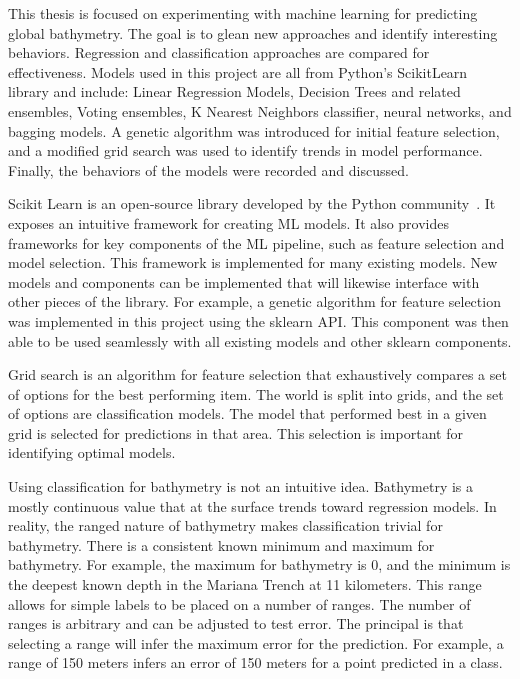 \par
This thesis is focused on experimenting with machine learning for predicting global bathymetry.
The goal is to glean new approaches and identify interesting behaviors.
Regression and classification approaches are compared for effectiveness.
Models used in this project are all from Python's ScikitLearn library and include: Linear Regression Models, Decision Trees and related ensembles, Voting ensembles, K Nearest Neighbors classifier, neural networks, and bagging models.
A genetic algorithm was introduced for initial feature selection, and a modified grid search was used to identify trends in model performance.
Finally, the behaviors of the models were recorded and discussed.

\par
Scikit Learn is an open-source library developed by the Python community~\cite{scikit-learn}.
It exposes an intuitive framework for creating \ac{ML} models.
It also provides frameworks for key components of the \ac{ML} pipeline, such as feature selection and model selection.
This framework is implemented for many existing models.
New models and components can be implemented that will likewise interface with other pieces of the library.
For example, a genetic algorithm for feature selection was implemented in this project using the sklearn \ac{API}.
This component was then able to be used seamlessly with all existing models and other sklearn components.

\par
Grid search is an algorithm for feature selection that exhaustively compares a set of options for the best performing item.
The world is split into grids, and the set of options are classification models.
The model that performed best in a given grid is selected for predictions in that area.
This selection is important for identifying optimal models.


\par
Using classification for bathymetry is not an intuitive idea.
Bathymetry is a mostly continuous value that at the surface trends toward regression models.
In reality, the ranged nature of bathymetry makes classification trivial for bathymetry.
There is a consistent known minimum and maximum for bathymetry.
For example, the maximum for bathymetry is 0, and the minimum is the deepest known depth in the Mariana Trench at 11 kilometers.
This range allows for simple labels to be placed on a number of ranges.
The number of ranges is arbitrary and can be adjusted to test error.
The principal is that selecting a range will infer the maximum error for the prediction.
For example, a range of 150 meters infers an error of 150 meters for a point predicted in a class.





